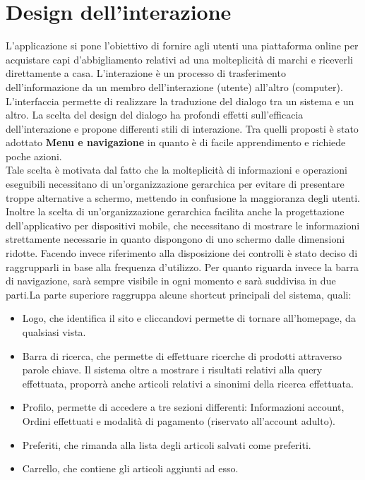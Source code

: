 \documentclass[12pt,a4paper]{report}
\begin{document}
\section{Design dell'interazione}
L'applicazione si pone l'obiettivo di fornire agli utenti una piattaforma online per acquistare capi d'abbigliamento relativi ad una molteplicità di marchi e riceverli direttamente a casa. L'interazione è un processo di trasferimento dell'informazione da un membro dell'interazione (utente) all'altro (computer). L'interfaccia permette di realizzare la traduzione del dialogo tra un sistema e un altro. La scelta del design del dialogo ha profondi effetti sull'efficacia dell'interazione e propone differenti stili di interazione. Tra quelli proposti è stato adottato \textbf{Menu e navigazione} in quanto è di facile apprendimento e richiede poche azioni.\\
Tale scelta è motivata dal fatto che la molteplicità di informazioni e operazioni eseguibili necessitano di un'organizzazione gerarchica per evitare di presentare troppe alternative a schermo, mettendo in confusione la maggioranza degli utenti. Inoltre la scelta di un'organizzazione gerarchica facilita anche la progettazione dell'applicativo per dispositivi mobile, che necessitano di mostrare le informazioni strettamente necessarie in quanto dispongono di uno schermo dalle dimensioni ridotte.
Facendo invece riferimento alla disposizione dei controlli è stato deciso di raggrupparli in base alla frequenza d'utilizzo. Per quanto riguarda invece la barra di navigazione, sarà sempre visibile in ogni momento e sarà suddivisa in due parti.La parte superiore raggruppa alcune shortcut principali del sistema, quali:
\begin{itemize}
  \item Logo, che identifica il sito e cliccandovi permette di tornare all'homepage, da qualsiasi vista.
  \item Barra di ricerca, che permette di effettuare ricerche di prodotti attraverso parole chiave. Il sistema oltre a mostrare i risultati relativi alla query effettuata, proporrà anche articoli relativi a sinonimi della ricerca effettuata.
  \item Profilo, permette di accedere a tre sezioni differenti: Informazioni account, Ordini effettuati e modalità di pagamento (riservato all'account adulto).
  \item Preferiti, che rimanda alla lista degli articoli salvati come preferiti.
  \item Carrello, che contiene gli articoli aggiunti ad esso.
\end{itemize}
\end{document}
